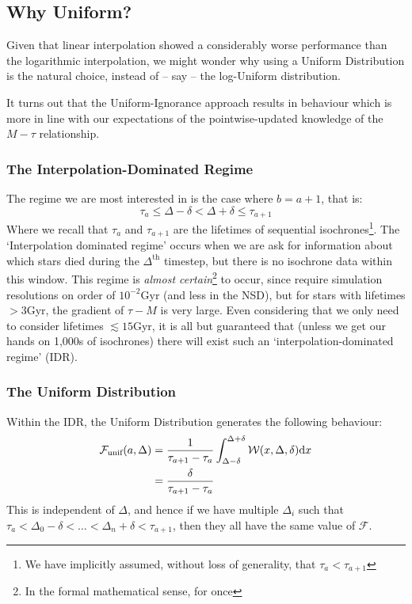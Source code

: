 \documentclass[a4paper,11pt]{article}
\def\d{\mathrm d}
\begin{document}
			\begin{aside}
				\footnotesize
			\subsection*{Why Uniform?}

				Given that linear interpolation showed a considerably worse performance than the logarithmic interpolation, we might wonder why using a Uniform Distribution is the natural choice, instead of -- say -- the log-Uniform distribution. 

				It turns out that the Uniform-Ignorance approach results in behaviour which is more in line with our expectations of the pointwise-updated knowledge of the $M-\tau$ relationship.
				
				\subsubsection{The Interpolation-Dominated Regime}
				
					The regime we are most interested in is the case where $b = a+1$, that is:
					\begin{equation}
						\tau_a \leq \Delta - \delta < \Delta + \delta \leq \tau_{a+1}
					\end{equation}
					Where we recall that $\tau_a$ and $\tau_{a+1}$ are the lifetimes of sequential isochrones\footnote{We have implicitly assumed, without loss of generality, that $\tau_a < \tau_{a+1}$}. The `Interpolation dominated regime' occurs when we are ask for information about which stars died during the $\Delta^\text{th}$ timestep, but there is no isochrone data within this window. This regime is \textit{almost certain}\footnote{In the formal mathematical sense, for once} to occur, since require simulation resolutions on order of $10^{-2}$Gyr (and less in the NSD), but for stars with lifetimes $>3$Gyr, the gradient of $\tau-M$ is very large. Even considering that we only need to consider lifetimes $\lesssim 15$Gyr, it is all but guaranteed that (unless we get our hands on 1,000s of isochrones) there will exist such an `interpolation-dominated regime' (IDR).

				\subsubsection{The Uniform Distribution}
					
					Within the IDR, the Uniform Distribution generates the following behaviour:
					\begin{align}
						\begin{split}
						\mathcal{F}_\text{unif}(a,\Delta) & = \frac{1}{\tau_{a+1} - \tau_a} \int_{\Delta - \delta}^{\Delta + \delta} \W(x,\Delta,\delta) \d x
						\\
						& = \frac{\delta}{\tau_{a+1} - \tau_a}
						\end{split}
					\end{align}
					This is independent of $\Delta$, and hence if we have multiple $\Delta_i$ such that $\tau_a < \Delta_0 - \delta < \hdots < \Delta_n+\delta < \tau_{a+1}$, then they all have the same value of $\mathcal{F}$. 


\end{aside}
\end{document}
